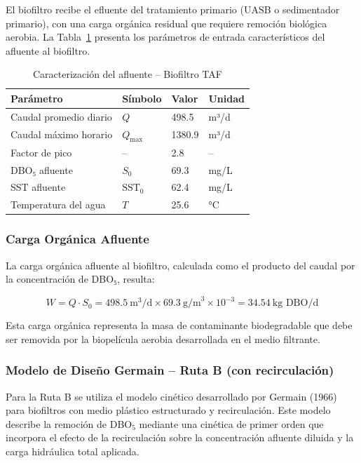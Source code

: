 \documentclass[12pt,a4paper]{article}
\begin{document}
El biofiltro recibe el efluente del tratamiento primario (UASB o sedimentador primario), con una carga orgánica residual que requiere remoción biológica aerobia. La Tabla~\ref{tab:entrada_taf} presenta los parámetros de entrada característicos del afluente al biofiltro.

\begin{table}[H]
\centering
\caption{Caracterización del afluente -- Biofiltro TAF}
\label{tab:entrada_taf}
\begin{tabular}{llll}
\toprule
\textbf{Parámetro} & \textbf{Símbolo} & \textbf{Valor} & \textbf{Unidad} \\
\midrule
Caudal promedio diario & $Q$ & 498.5 & m³/d \\
Caudal máximo horario & $Q_{\text{max}}$ & 1380.9 & m³/d \\
Factor de pico & -- & 2.8 & -- \\
DBO₅ afluente & $S_0$ & 69.3 & mg/L \\
SST afluente & $\text{SST}_0$ & 62.4 & mg/L \\
Temperatura del agua & $T$ & 25.6 & °C \\

\bottomrule
\end{tabular}
\end{table}

\subsubsection*{Carga Orgánica Afluente}

La carga orgánica afluente al biofiltro, calculada como el producto del caudal por la concentración de DBO₅, resulta:

\begin{equation}
W = Q \cdot S_0 = 498.5\ \text{m}^3\text{/d} \times 69.3\ \text{g/m}^3 \times 10^{-3} = 34.54\ \text{kg DBO/d}
\end{equation}

Esta carga orgánica representa la masa de contaminante biodegradable que debe ser removida por la biopelícula aerobia desarrollada en el medio filtrante.

\subsubsection*{Modelo de Diseño Germain -- Ruta B (con recirculación)}

Para la Ruta B se utiliza el modelo cinético desarrollado por Germain (1966) para biofiltros con medio plástico estructurado y recirculación. Este modelo describe la remoción de DBO$_5$ mediante una cinética de primer orden que incorpora el efecto de la recirculación sobre la concentración afluente diluida y la carga hidráulica total aplicada.
\end{document}
